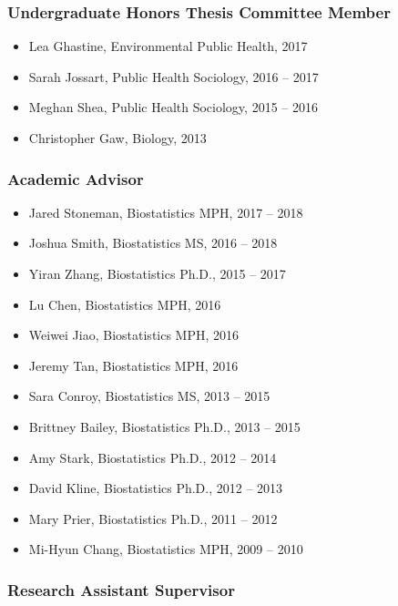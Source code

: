 \documentclass[
  english,
  letterpaper,
  DIV=11,
  numbers=noendperiod]{scrartcl}
\providecommand{\tightlist}{%
  \setlength{\itemsep}{0pt}\setlength{\parskip}{0pt}}
\begin{document}
\subsubsection{Undergraduate Honors Thesis Committee
Member}\label{undergraduate-honors-thesis-committee-member}

\begin{itemize}
\tightlist
\item
  Lea Ghastine, Environmental Public Health, 2017
\item
  Sarah Jossart, Public Health Sociology, 2016 -- 2017
\item
  Meghan Shea, Public Health Sociology, 2015 -- 2016
\item
  Christopher Gaw, Biology, 2013
\end{itemize}

\subsubsection{Academic Advisor}\label{academic-advisor}

\begin{itemize}
\tightlist
\item
  Jared Stoneman, Biostatistics MPH, 2017 -- 2018
\item
  Joshua Smith, Biostatistics MS, 2016 -- 2018
\item
  Yiran Zhang, Biostatistics Ph.D., 2015 -- 2017
\item
  Lu Chen, Biostatistics MPH, 2016
\item
  Weiwei Jiao, Biostatistics MPH, 2016
\item
  Jeremy Tan, Biostatistics MPH, 2016
\item
  Sara Conroy, Biostatistics MS, 2013 -- 2015
\item
  Brittney Bailey, Biostatistics Ph.D., 2013 -- 2015
\item
  Amy Stark, Biostatistics Ph.D., 2012 -- 2014
\item
  David Kline, Biostatistics Ph.D., 2012 -- 2013
\item
  Mary Prier, Biostatistics Ph.D., 2011 -- 2012
\item
  Mi-Hyun Chang, Biostatistics MPH, 2009 -- 2010
\end{itemize}

\subsubsection{Research Assistant
Supervisor}\label{research-assistant-supervisor}
\end{document}
